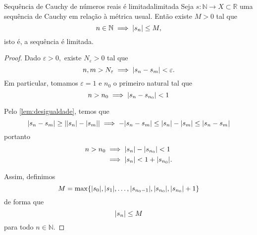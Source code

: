 \begin{lemma}{Sequência de Cauchy de números reais é limitada}{limitada}
    Seja \(s : \mathbb{N} \to X \subset \mathbb{R}\) uma sequência de Cauchy em relação à métrica usual. Então existe \(M > 0\) tal que
    \begin{equation*}
        n \in \mathbb{N} \implies \lvert s_n\rvert \leq M,
    \end{equation*}
    isto é, a sequência é limitada.
\end{lemma}
\begin{proof}
    Dado \(\varepsilon > 0,\) existe \(N_{\varepsilon} > 0\) tal que
    \begin{equation*}
        n, m > N_{\varepsilon} \implies \lvert s_n - s_m\rvert < \varepsilon.
    \end{equation*}
    Em particular, tomamos \(\varepsilon = 1\) e \(n_0\) o primeiro natural tal que
    \begin{equation*}
        n > n_0 \implies \lvert s_n - s_{n_0}\rvert < 1
    \end{equation*}

    Pelo \cref{lem:desigualdade}, temos que
    \begin{equation*}
        \lvert s_n - s_m\rvert \geq \lvert\lvert s_n\rvert - \lvert s_m\rvert\rvert \implies -\lvert s_n - s_m\rvert\leq \lvert s_n\rvert - \lvert s_m\rvert \leq \lvert s_n - s_m\rvert
    \end{equation*}
    portanto
    \begin{align*}
        n > n_0 &\implies \lvert s_n\rvert - \lvert s_{n_0}\rvert < 1\\
                &\implies \lvert s_n\rvert < 1 + \lvert s_{n_0}\rvert.
    \end{align*}

    Assim, definimos
    \begin{equation*}
        M = \max\set*{\abs{s_0}, \abs{s_1}, \dots, \abs{s_{n_0-1}}, \abs{s_{n_0}}, \abs{s_{n_0}}+ 1}
    \end{equation*}
    de forma que
    \begin{equation*}
        \lvert s_n\rvert \leq M
    \end{equation*}
    para todo \(n \in \mathbb{N}\).
\end{proof}

